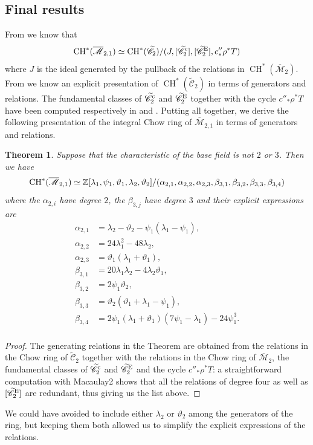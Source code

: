 \documentclass[a4paper, 10pt]{amsart}
\numberwithin{equation}{section}
\numberwithin{subsection}{section}
\newtheorem{theorem}{Theorem}[section]
\theoremstyle{definition}
\theoremstyle{remark}
\renewcommand{\mathcal}{\mathscr}
\newcommand\cM{\mathcal{M}} \newcommand\cN{\mathcal{N}}
\newcommand{\Mbar}{\overline{\cM}}
\newcommand{\Ctilde}{\widetilde{\mathcal C}}
\newcommand{\ch}[1][*]{\operatorname{CH}^{#1}}
\begin{document}
	
	
	
	
	
	\subsection{Final results}
	From  we know that
	\[\ch(\Mbar_{2,1})\simeq\ch(\Ctilde_2)/(J,[\Ctilde_{2}^{\rm c}],[\Ctilde_2^{\rm E}],c''_*\rho^*T) \]
	where $J$ is the ideal generated by the pullback of the relations in $\ch(\Mbar_2)$. From  we know an explicit presentation of $\ch(\Ctilde_2)$ in terms of generators and relations. The fundamental classes of $\Ctilde_2^{\rm c}$ and $\Ctilde_2^{\rm E}$ together with the cycle $c''_*\rho^*T$ have been computed respectively in  and . Putting all together, we derive the following presentation of the integral Chow ring of $\Mbar_{2,1}$ in terms of generators and relations.
	\begin{theorem}\label{thm:chow Mbar21}
		Suppose that the characteristic of the base field is not $2$ or $3$. Then we have
		\[ \ch(\Mbar_{2,1})\simeq \ZZ[\lambda_1,\psi_1,\vartheta_1,\lambda_2, \vartheta_2]/(\alpha_{2,1},\alpha_{2,2},\alpha_{2,3},\beta_{3,1},\beta_{3,2},\beta_{3,3},\beta_{3,4}) \]
		where the $\alpha_{2,i}$ have degree $2$, the $\beta_{3,j}$ have degree $3$ and their explicit expressions are
		\begin{align*}
			\alpha_{2,1}&=\lambda_2-\vartheta_2-\psi_1(\lambda_1-\psi_1),\\
			\alpha_{2,2}&=24\lambda_1^2-48\lambda_2,\\
			\alpha_{2,3}&=\vartheta_1(\lambda_1+\vartheta_1),\\
			\beta_{3,1}&=20\lambda_1\lambda_2-4\lambda_2\vartheta_1,\\
			\beta_{3,2}&=2\psi_1\vartheta_2,\\
			\beta_{3,3}&=\vartheta_2(\vartheta_1+\lambda_1-\psi_1),\\
			\beta_{3,4}&=2\psi_1(\lambda_1 +\vartheta_1)(7\psi_1-\lambda_1) - 24\psi_1^3.\\
		\end{align*}
	\end{theorem}
	\begin{proof}
		The generating relations in the Theorem are obtained from the relations in the Chow ring of $\Ctilde_2$ together with the relations in the Chow ring of $\Mbar_2$, the fundamental classes of $\Ctilde_2^{\rm c}$ and $\Ctilde_2^{\rm E}$ and the cycle $c''_*\rho^*T$: a straightforward computation with Macaulay2 shows that all the relations of degree four as well as $[\Ctilde_2^{\rm E}]$ are redundant, thus giving us the list above.
	\end{proof}
	We could have avoided to include either $\lambda_2$ or $\vartheta_2$ among the generators of the ring, but keeping them both allowed us to simplify the explicit expressions of the relations.
	
\end{document}
